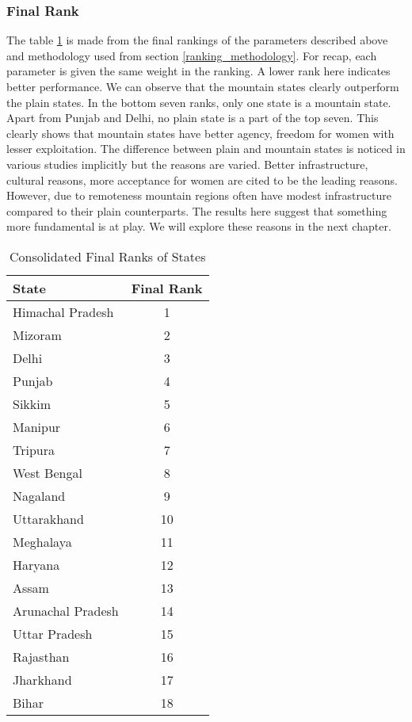\subsubsection{Final Rank}
 The table \ref{tab:consolidated_ranks} is made from the final rankings of the parameters described above and methodology used from section \ref{ranking_methodology}. For recap, each parameter is given the same weight in the ranking. A lower rank here indicates better performance. We can observe that the mountain states clearly outperform the plain states. In the bottom seven ranks, only one state is a mountain state. Apart from Punjab and Delhi, no plain state is a part of the top seven. This clearly shows that mountain states have better agency, freedom for women with lesser exploitation. The difference between plain and mountain states is noticed in various studies implicitly \citep{kishor2004women} but the reasons are varied. Better infrastructure, cultural reasons, more acceptance for women are cited to be the leading reasons. However, due to remoteness mountain regions often have modest infrastructure compared to their plain counterparts. The results here suggest that something more fundamental is at play. We will explore these reasons in the next chapter.
\begin{table}[h!]
\centering
\begin{tabular}{|l|c|}
\hline
\textbf{State} & \textbf{Final Rank} \\
\hline
Himachal Pradesh & 1 \\
Mizoram & 2 \\
Delhi & 3 \\
Punjab & 4 \\
Sikkim & 5 \\
Manipur & 6 \\
Tripura & 7 \\
West Bengal & 8 \\
Nagaland & 9 \\
Uttarakhand & 10 \\
Meghalaya & 11 \\
Haryana & 12 \\
Assam & 13 \\
Arunachal Pradesh & 14 \\
Uttar Pradesh & 15 \\
Rajasthan & 16 \\
Jharkhand & 17 \\
Bihar & 18 \\
\hline
\end{tabular}
\caption{Consolidated Final Ranks of States}
\label{tab:consolidated_ranks}
\end{table}